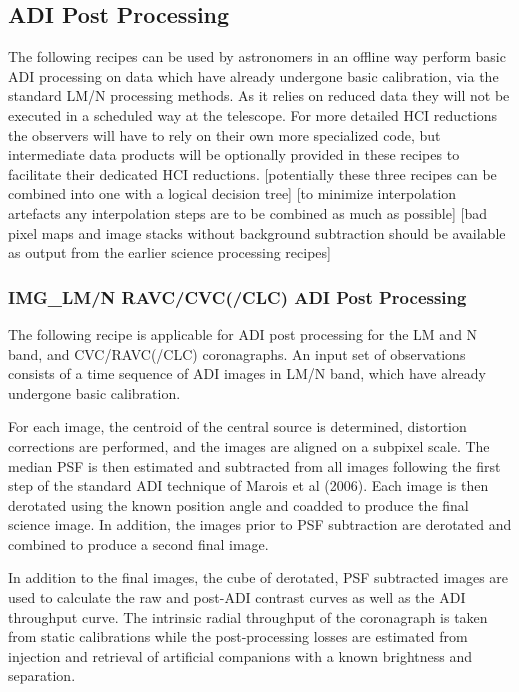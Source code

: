 
\subsection{ADI Post Processing}
\label{}



The following recipes can be used by astronomers in an offline way
perform basic ADI processing on data which have already undergone
basic calibration, via the standard LM/N processing methods.  As it
relies on reduced data they will not be executed in a scheduled way at
the telescope. For more detailed HCI reductions the observers will
have to rely on their own more specialized code, but intermediate data
products will be optionally provided in these recipes to facilitate
their dedicated HCI reductions. [potentially these three recipes can
  be combined into one with a logical decision tree] [to minimize
  interpolation artefacts any interpolation steps are to be combined
  as much as possible] [bad pixel maps and image stacks without
  background subtraction should be available as output from the
  earlier science processing recipes]

\subsubsection{IMG\_LM/N RAVC/CVC(/CLC) ADI Post Processing}
\label{}


The following recipe is applicable for ADI post processing for the LM
and N band, and CVC/RAVC(/CLC) coronagraphs. An input set of
observations consists of a time sequence of ADI images in LM/N band, which
have already undergone basic calibration.

For each image, the centroid of the central source is determined,
distortion corrections are performed, and the images are aligned on a
subpixel scale. The median PSF is then estimated and subtracted from
all images following the first step of the standard ADI technique of Marois et al (2006). 
Each image is then derotated using the known position angle and
coadded to produce the final science image. In addition, the images
prior to PSF subtraction are derotated and combined to produce a second final
image.

In addition to the final images, the cube of derotated, PSF subtracted
images are used to calculate the raw and post-ADI contrast curves
as well as the ADI throughput curve. The intrinsic radial throughput of the coronagraph 
is taken from static calibrations while the post-processing losses are estimated from injection 
and retrieval of artificial companions with a known brightness and separation.

